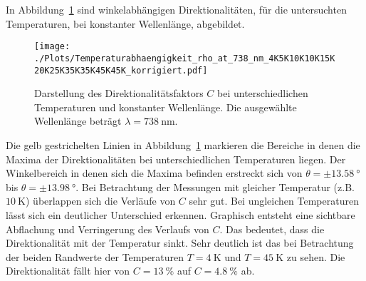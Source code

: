 In Abbildung~\ref{fig:temp_all_nach} sind winkelabhängigen Direktionalitäten, für die untersuchten Temperaturen,
bei konstanter Wellenlänge, abgebildet.
\begin{figure}
    \centering
    \texttt{[image: ./Plots/Temperaturabhaengigkeit\_rho\_at\_738\_nm\_4K5K10K10K15K20K25K35K35K45K45K\_korrigiert.pdf]}
    \caption{Darstellung des Direktionalitätsfaktors $C$ bei unterschiedlichen Temperaturen und konstanter Wellenlänge.
    Die ausgewählte Wellenlänge beträgt $\lambda =\SI{738}{\nano\meter}$.}
    \label{fig:temp_all_nach}
\end{figure}
\FloatBarrier

Die gelb gestrichelten Linien in Abbildung~\ref{fig:temp_all_nach} markieren die Bereiche 
in denen die Maxima der Direktionalitäten
bei unterschiedlichen Temperaturen liegen.
Der Winkelbereich in denen sich die Maxima befinden erstreckt sich von  $\theta = \pm \SI{13,58}{\degree} 
$ bis $ \theta = \pm \SI{13,98}{\degree}$.
Bei Betrachtung der Messungen mit gleicher Temperatur (z.B. $\SI{10}{\kelvin}$) 
überlappen sich die Verläufe von $C$ sehr gut.
Bei ungleichen Temperaturen lässt sich ein deutlicher Unterschied erkennen.
Graphisch entsteht eine sichtbare Abflachung und Verringerung des Verlaufs von $C$.
Das bedeutet, dass die Direktionalität mit der Temperatur sinkt.
Sehr deutlich ist das bei Betrachtung der beiden Randwerte 
der Temperaturen $T = \SI{4}{\kelvin}$ und $ T = \SI{45}{\kelvin}$ zu sehen.
Die Direktionalität fällt hier von $C= \SI{13}{\percent}$ auf $C = \SI{4,8}{\percent}$ ab.

